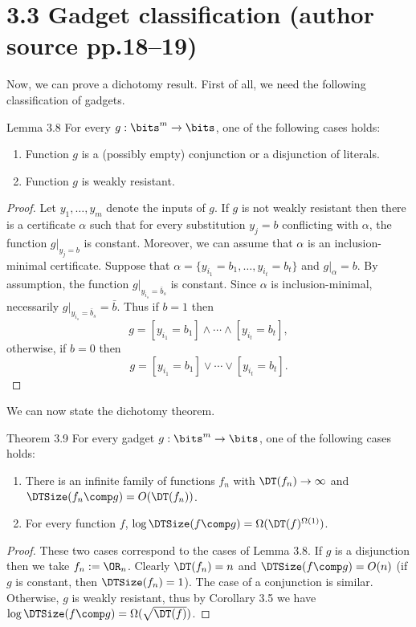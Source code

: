 \section*{3.3 Gadget classification (author source pp.18--19)}
Now, we can prove a dichotomy result. First of all, we need the following classification of gadgets.
\begin{originalresult}{Lemma 3.8}
For every $g:\bits^m\to\bits$, one of the following cases holds:
\begin{enumerate}
\item[(i)] Function $g$ is a (possibly empty) conjunction or a disjunction of literals.
\item[(ii)] Function $g$ is weakly resistant.
\end{enumerate}
\end{originalresult}
\begin{proof}
Let $y_1,\ldots,y_m$ denote the inputs of $g$. If $g$ is not weakly resistant then there is a certificate $\alpha$ such that for every substitution $y_j=b$ conflicting with $\alpha$, the function $g|_{y_j=b}$ is constant. Moreover, we can assume that $\alpha$ is an inclusion-minimal certificate.
Suppose that $\alpha=\{y_{i_1}=b_1,\ldots,y_{i_t}=b_t\}$ and $g|_\alpha=b$. By assumption, the function $g|_{y_{i_s}=\bar b_s}$ is constant. Since $\alpha$ is inclusion-minimal, necessarily $g|_{y_{i_s}=\bar b_s}=\bar b$. Thus if $b=1$ then
\[g=[y_{i_1}=b_1]\wedge\cdots\wedge[y_{i_t}=b_t],\]
otherwise, if $b=0$ then
\[g=[y_{i_1}=b_1]\vee\cdots\vee[y_{i_t}=b_t].\]
\end{proof}
We can now state the dichotomy theorem.
\begin{originalresult}{Theorem 3.9}
For every gadget $g:\bits^m\to\bits$, one of the following cases holds:
\begin{enumerate}
\item[(i)] There is an infinite family of functions $f_n$ with $\DT(f_n)\to\infty$ and $\DTSize(f_n\comp g)=O(\DT(f_n))$.
\item[(ii)] For every function $f$, $\log\DTSize(f\comp g)=\Omega(\DT(f)^{\Omega(1)})$.
\end{enumerate}
\end{originalresult}
\begin{proof}
These two cases correspond to the cases of Lemma 3.8. If $g$ is a disjunction then we take $f_n:=\OR_n$. Clearly $\DT(f_n)=n$ and $\DTSize(f\comp g)=O(n)$ (if $g$ is constant, then $\DTSize(f_n)=1$). The case of a conjunction is similar.
Otherwise, $g$ is weakly resistant, thus by Corollary 3.5 we have $\log\DTSize(f\comp g)=\Omega(\sqrt{\DT(f)})$.
\end{proof}

